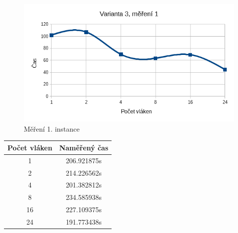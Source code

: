 \documentclass[12pt]{article}
\begin{document}
\begin{figure}[H]
  \begin{center}
     \includegraphics[width=12cm]{images/ssef1.png}
    \caption{Měření 1. instance} 
  \end{center}
\end{figure}
%
%
\begin{center}
\begin{tabular}{ c | c }
\textbf{Počet vláken} & \textbf{Naměřený čas} \\ \hline \hline 
1 & 206.921875s \\ \hline
2 & 214.226562s \\ \hline
4 & 201.382812s \\ \hline
8 & 234.585938s \\ \hline
16 & 227.109375s \\ \hline
24 & 191.773438s \\ \hline
\end{tabular}
\end{center}
\end{document}
